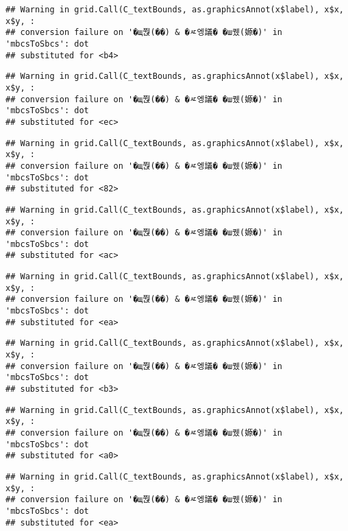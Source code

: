 \documentclass[
]{article}
\begin{document}
\begin{verbatim}
## Warning in grid.Call(C_textBounds, as.graphicsAnnot(x$label), x$x, x$y, :
## conversion failure on '�щ쭩(��) & �ㅼ엥議� �ш퀬(嫄�)' in 'mbcsToSbcs': dot
## substituted for <b4>
\end{verbatim}

\begin{verbatim}
## Warning in grid.Call(C_textBounds, as.graphicsAnnot(x$label), x$x, x$y, :
## conversion failure on '�щ쭩(��) & �ㅼ엥議� �ш퀬(嫄�)' in 'mbcsToSbcs': dot
## substituted for <ec>
\end{verbatim}

\begin{verbatim}
## Warning in grid.Call(C_textBounds, as.graphicsAnnot(x$label), x$x, x$y, :
## conversion failure on '�щ쭩(��) & �ㅼ엥議� �ш퀬(嫄�)' in 'mbcsToSbcs': dot
## substituted for <82>
\end{verbatim}

\begin{verbatim}
## Warning in grid.Call(C_textBounds, as.graphicsAnnot(x$label), x$x, x$y, :
## conversion failure on '�щ쭩(��) & �ㅼ엥議� �ш퀬(嫄�)' in 'mbcsToSbcs': dot
## substituted for <ac>
\end{verbatim}

\begin{verbatim}
## Warning in grid.Call(C_textBounds, as.graphicsAnnot(x$label), x$x, x$y, :
## conversion failure on '�щ쭩(��) & �ㅼ엥議� �ш퀬(嫄�)' in 'mbcsToSbcs': dot
## substituted for <ea>
\end{verbatim}

\begin{verbatim}
## Warning in grid.Call(C_textBounds, as.graphicsAnnot(x$label), x$x, x$y, :
## conversion failure on '�щ쭩(��) & �ㅼ엥議� �ш퀬(嫄�)' in 'mbcsToSbcs': dot
## substituted for <b3>
\end{verbatim}

\begin{verbatim}
## Warning in grid.Call(C_textBounds, as.graphicsAnnot(x$label), x$x, x$y, :
## conversion failure on '�щ쭩(��) & �ㅼ엥議� �ш퀬(嫄�)' in 'mbcsToSbcs': dot
## substituted for <a0>
\end{verbatim}

\begin{verbatim}
## Warning in grid.Call(C_textBounds, as.graphicsAnnot(x$label), x$x, x$y, :
## conversion failure on '�щ쭩(��) & �ㅼ엥議� �ш퀬(嫄�)' in 'mbcsToSbcs': dot
## substituted for <ea>
\end{verbatim}
\end{document}
